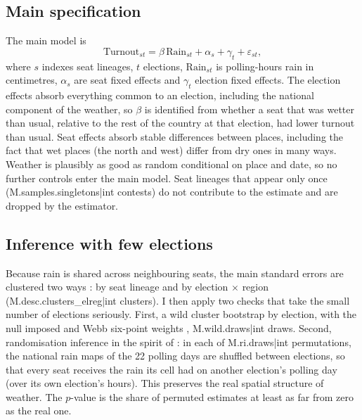\documentclass[11pt,a4paper]{article}
\begin{document}
\subsection{Main specification}
The main model is
\begin{equation}
\text{Turnout}_{st} = \beta\,\text{Rain}_{st} + \alpha_s + \gamma_t + \varepsilon_{st},
\end{equation}
where $s$ indexes seat lineages, $t$ elections, $\text{Rain}_{st}$ is polling-hours rain in centimetres, $\alpha_s$ are seat fixed effects and $\gamma_t$ election fixed effects. The election effects absorb everything common to an election, including the national component of the weather, so $\beta$ is identified from whether a seat that was wetter than usual, relative to the rest of the country at that election, had lower turnout than usual. Seat effects absorb stable differences between places, including the fact that wet places (the north and west) differ from dry ones in many ways. Weather is plausibly as good as random conditional on place and date, so no further controls enter the main model. Seat lineages that appear only once ({{M.samples.singletons|int}} contests) do not contribute to the estimate and are dropped by the estimator.

\subsection{Inference with few elections}
Because rain is shared across neighbouring seats, the main standard errors are clustered two ways \citep{cameron2011}: by seat lineage and by election $\times$ region ({{M.desc.clusters_elreg|int}} clusters). I then apply two checks that take the small number of elections seriously. First, a wild cluster bootstrap by election, with the null imposed and Webb six-point weights \citep{cameron2008,webb2023}, {{M.wild.draws|int}} draws. Second, randomisation inference in the spirit of \citet{cooperman2017}: in each of {{M.ri.draws|int}} permutations, the national rain maps of the 22 polling days are shuffled between elections, so that every seat receives the rain its cell had on another election's polling day (over its own election's hours). This preserves the real spatial structure of weather. The $p$-value is the share of permuted estimates at least as far from zero as the real one.
\end{document}
